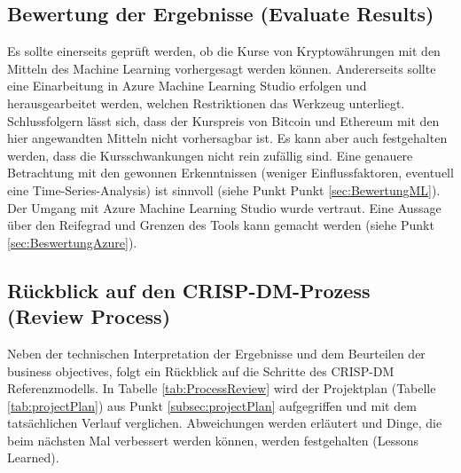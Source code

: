 \subsection{Bewertung der Ergebnisse (Evaluate Results)} \label{subsec:revRes}
Es sollte einerseits geprüft werden, ob die Kurse von Kryptowährungen mit den Mitteln des Machine Learning vorhergesagt werden können. Andererseits sollte eine Einarbeitung in Azure Machine Learning Studio erfolgen und herausgearbeitet werden, welchen Restriktionen das Werkzeug unterliegt.
Schlussfolgern lässt sich, dass der Kurspreis von Bitcoin und Ethereum mit den hier angewandten Mitteln nicht vorhersagbar ist. Es kann aber auch festgehalten werden, dass die Kursschwankungen nicht rein zufällig sind. Eine genauere Betrachtung mit den gewonnen Erkenntnissen (weniger Einflussfaktoren, eventuell eine Time-Series-Analysis) ist sinnvoll (siehe Punkt Punkt \ref{sec:BewertungML}).
Der Umgang mit Azure Machine Learning Studio wurde vertraut. Eine Aussage über den Reifegrad und Grenzen des Tools kann gemacht werden (siehe Punkt \ref{sec:BeswertungAzure}).

\subsection{Rückblick auf den CRISP-DM-Prozess (Review Process)}
Neben der technischen Interpretation der Ergebnisse und dem Beurteilen der business objectives, folgt ein Rückblick auf die Schritte des CRISP-DM Referenzmodells.
In Tabelle \ref{tab:ProcessReview} wird der Projektplan (Tabelle \ref{tab:projectPlan}) aus Punkt \ref{subsec:projectPlan} aufgegriffen und mit dem tatsächlichen Verlauf verglichen. Abweichungen werden erläutert und Dinge, die beim nächsten Mal verbessert werden können, werden festgehalten (Lessons Learned).


